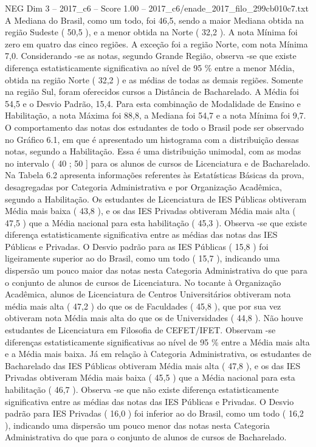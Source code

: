 \begin{textsample}{NEG Dim 3 – 2017\_c6 – Score 1.00 – 2017\_c6/enade\_2017\_filo\_299cb010c7.txt}
A Mediana do Brasil, como um todo, foi 46,5, sendo a maior Mediana obtida na região Sudeste ( 50,5 ), e a menor obtida na Norte ( 32,2 ).
A nota Mínima foi zero em quatro das cinco regiões.
A exceção foi a região Norte, com nota Mínima 7,0.
Considerando -se as notas, segundo Grande Região, observa -se que existe diferença estatisticamente significativa ao nível de 95 \% entre a menor Média, obtida na região Norte ( 32,2 ) e as médias de todas as demais regiões.
Somente na região Sul, foram oferecidos cursos a Distância de Bacharelado.
A Média foi 54,5 e o Desvio Padrão, 15,4.
Para esta combinação de Modalidade de Ensino e Habilitação, a nota Máxima foi 88,8, a Mediana foi 54,7 e a nota Mínima foi 9,7.
O comportamento das notas dos estudantes de todo o Brasil pode ser observado no Gráfico 6.1, em que é apresentado um histograma com a distribuição dessas notas, segundo a Habilitação.
Essa é uma distribuição unimodal, com as modas no intervalo ( 40 ; 50 ] para os alunos de cursos de Licenciatura e de Bacharelado.
Na Tabela 6.2 apresenta informações referentes às Estatísticas Básicas da prova, desagregadas por Categoria Administrativa e por Organização Acadêmica, segundo a Habilitação.
Os estudantes de Licenciatura de IES Públicas obtiveram Média mais baixa ( 43,8 ), e os das IES Privadas obtiveram Média mais alta ( 47,5 ) que a Média nacional para esta habilitação ( 45,3 ).
Observa -se que existe diferença estatisticamente significativa entre as médias das notas das IES Públicas e Privadas.
O Desvio padrão para as IES Públicas ( 15,8 ) foi ligeiramente superior ao do Brasil, como um todo ( 15,7 ), indicando uma dispersão um pouco maior das notas nesta Categoria Administrativa do que para o conjunto de alunos de cursos de Licenciatura.
No tocante à Organização Acadêmica, alunos de Licenciatura de Centros Universitários obtiveram nota média mais alta ( 47,2 ) do que os de Faculdades ( 45,8 ), que por sua vez obtiveram nota Média mais alta do que os de Universidades ( 44,8 ).
Não houve estudantes de Licenciatura em Filosofia de CEFET/IFET.
Observam -se diferenças estatisticamente significativas ao nível de 95 \% entre a Média mais alta e a Média mais baixa.
Já em relação à Categoria Administrativa, os estudantes de Bacharelado das IES Públicas obtiveram Média mais alta ( 47,8 ), e os das IES Privadas obtiveram Média mais baixa ( 45,5 ) que a Média nacional para esta habilitação ( 46,7 ).
Observa -se que não existe diferença estatisticamente significativa entre as médias das notas das IES Públicas e Privadas.
O Desvio padrão para IES Privadas ( 16,0 ) foi inferior ao do Brasil, como um todo ( 16,2 ), indicando uma dispersão um pouco menor das notas nesta Categoria Administrativa do que para o conjunto de alunos de cursos de Bacharelado.

\end{textsample}

